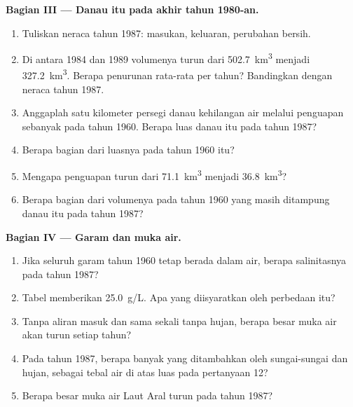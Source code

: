 \begin{problem}
\medskip
\noindent\textbf{Bagian III --- Danau itu pada akhir tahun 1980-an.}
\begin{enumerate}[resume]
  \item Tuliskan neraca tahun 1987: masukan, keluaran, perubahan bersih.
  \item Di antara 1984 dan 1989 volumenya turun dari \qty{502.7}{km^3}
        menjadi \qty{327.2}{km^3}. Berapa penurunan rata-rata per tahun?
        Bandingkan dengan neraca tahun 1987.
  \item Anggaplah satu kilometer persegi danau kehilangan air melalui
        penguapan sebanyak pada tahun 1960. Berapa luas danau itu pada tahun
        1987?
  \item Berapa bagian dari luasnya pada tahun 1960 itu?
  \item Mengapa penguapan turun dari \qty{71.1}{km^3} menjadi
        \qty{36.8}{km^3}?
  \item Berapa bagian dari volumenya pada tahun 1960 yang masih ditampung
        danau itu pada tahun 1987?
\end{enumerate}

\medskip
\noindent\textbf{Bagian IV --- Garam dan muka air.}
\begin{enumerate}[resume]
  \item Jika seluruh garam tahun 1960 tetap berada dalam air, berapa
        salinitasnya pada tahun 1987?
  \item Tabel memberikan \qty{25.0}{g/L}. Apa yang diisyaratkan oleh
        perbedaan itu?
  \item Tanpa aliran masuk dan sama sekali tanpa hujan, berapa besar muka air
        akan turun setiap tahun?
  \item Pada tahun 1987, berapa banyak yang ditambahkan oleh sungai-sungai dan
        hujan, sebagai tebal air di atas luas pada pertanyaan 12?
  \item Berapa besar muka air Laut Aral turun pada tahun 1987?
\end{enumerate}
\end{problem}
